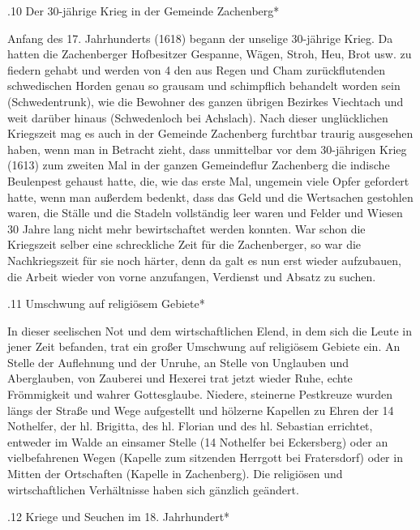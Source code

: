 .10 Der 30-jährige Krieg in der Gemeinde Zachenberg*

Anfang des 17. Jahrhunderts (1618) begann der unselige 30-jährige Krieg. Da
hatten die Zachenberger Hofbesitzer Gespanne, Wägen, Stroh, Heu, Brot usw. zu
fiedern gehabt und werden von 4 den aus Regen und Cham zurückflutenden
schwedischen Horden genau so grausam und schimpflich behandelt worden sein
(Schwedentrunk), wie die Bewohner des ganzen übrigen Bezirkes Viechtach und weit
darüber hinaus (Schwedenloch bei Achslach). Nach dieser unglücklichen Kriegszeit
mag es auch in der Gemeinde Zachenberg furchtbar traurig ausgesehen haben, wenn
man in Betracht zieht, dass unmittelbar vor dem 30-jährigen Krieg (1613) zum
zweiten Mal in der ganzen Gemeindeflur Zachenberg die indische Beulenpest
gehaust hatte, die, wie das erste Mal, ungemein viele Opfer gefordert hatte,
wenn man außerdem bedenkt, dass das Geld und die Wertsachen gestohlen waren, die
Ställe und die Stadeln vollständig leer waren und Felder und Wiesen 30 Jahre
lang nicht mehr bewirtschaftet werden konnten. War schon die Kriegszeit selber
eine schreckliche Zeit für die Zachenberger, so war die Nachkriegszeit für sie
noch härter, denn da galt es nun erst wieder aufzubauen, die Arbeit wieder von
vorne anzufangen, Verdienst und Absatz zu suchen.

.11 Umschwung auf religiösem Gebiete*

In dieser seelischen Not und dem wirtschaftlichen Elend, in dem sich die Leute
in jener Zeit befanden, trat ein großer Umschwung auf religiösem Gebiete ein. An
Stelle der Auflehnung und der Unruhe, an Stelle von Unglauben und Aberglauben,
von Zauberei und Hexerei trat jetzt wieder Ruhe, echte Frömmigkeit und wahrer
Gottesglaube. Niedere, steinerne Pestkreuze wurden längs der Straße und Wege
aufgestellt und hölzerne Kapellen zu Ehren der 14 Nothelfer, der hl. Brigitta,
des hl. Florian und des hl. Sebastian errichtet, entweder im Walde an einsamer
Stelle (14 Nothelfer bei Eckersberg) oder an vielbefahrenen Wegen (Kapelle zum
sitzenden Herrgott bei Fratersdorf) oder in Mitten der Ortschaften (Kapelle in
Zachenberg). Die religiösen und wirtschaftlichen Verhältnisse haben sich
gänzlich geändert.

.12 Kriege und Seuchen im 18. Jahrhundert*

